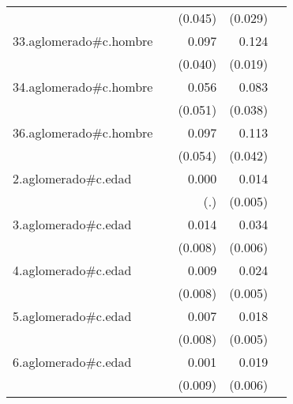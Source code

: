 {\begin{longtable}{l*{4}{D{.}{.}{-1}}}
            &                     &     (0.045)         &     (0.029)         &                     \\
\addlinespace
33.aglomerado#c.hombre&                     &       0.097\sym{*}  &       0.124\sym{***}&                     \\
            &                     &     (0.040)         &     (0.019)         &                     \\
\addlinespace
34.aglomerado#c.hombre&                     &       0.056         &       0.083\sym{*}  &                     \\
            &                     &     (0.051)         &     (0.038)         &                     \\
\addlinespace
36.aglomerado#c.hombre&                     &       0.097         &       0.113\sym{**} &                     \\
            &                     &     (0.054)         &     (0.042)         &                     \\
\addlinespace
2.aglomerado#c.edad&                     &       0.000         &       0.014\sym{*}  &                     \\
            &                     &         (.)         &     (0.005)         &                     \\
\addlinespace
3.aglomerado#c.edad&                     &       0.014         &       0.034\sym{***}&                     \\
            &                     &     (0.008)         &     (0.006)         &                     \\
\addlinespace
4.aglomerado#c.edad&                     &       0.009         &       0.024\sym{***}&                     \\
            &                     &     (0.008)         &     (0.005)         &                     \\
\addlinespace
5.aglomerado#c.edad&                     &       0.007         &       0.018\sym{***}&                     \\
            &                     &     (0.008)         &     (0.005)         &                     \\
\addlinespace
6.aglomerado#c.edad&                     &       0.001         &       0.019\sym{**} &                     \\
            &                     &     (0.009)         &     (0.006)         &                     \\

\end{longtable}}
